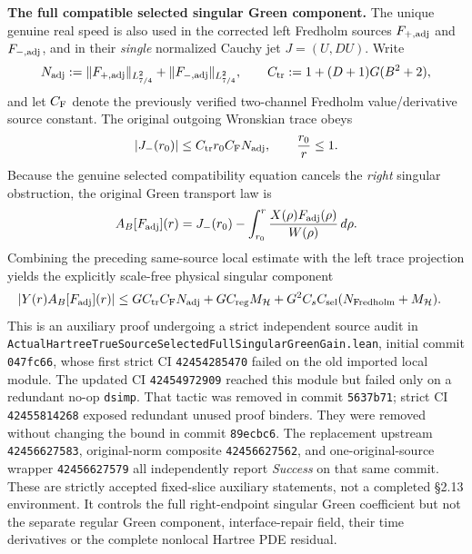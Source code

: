 \documentclass[11pt]{amsart}
\newcommand{\HH}{\mathcal H}
\begin{document}
\medskip
\noindent\textbf{The full compatible selected singular Green component.}
The unique genuine real speed is also used in the corrected left
Fredholm sources \(F_{+,{\rm adj}}\) and \(F_{-,{\rm adj}}\), and in their
\emph{single} normalized Cauchy jet \(J=(U,DU)\). Write
\[
 N_{\rm adj}
 :=\|F_{+,{\rm adj}}\|_{L^2_{7/4}}
   +\|F_{-,{\rm adj}}\|_{L^2_{7/4}},\qquad
 C_{\rm tr}:=1+(D+1)G(B^2+2),
\]
and let \(C_{\rm F}\) denote the previously verified
two-channel Fredholm value/derivative source constant.
The original outgoing Wronskian trace obeys
\[
 |J_-(r_0)|\le C_{\rm tr}r_0 C_{\rm F}N_{\rm adj},
 \qquad
 \frac{r_0}{r}\le1.
\]
Because the genuine selected compatibility equation cancels the
\emph{right} singular obstruction, the original Green transport law is
\[
 A_B[F_{\rm adj}](r)
 =J_-(r_0)-\int_{r_0}^{r}
    \frac{X(\rho)F_{\rm adj}(\rho)}{W(\rho)}\,d\rho.
\]
Combining the preceding same-source local estimate with the left trace
projection yields the explicitly scale-free physical singular component
\begin{align}
 |Y(r)A_B[F_{\rm adj}](r)|
 &\le GC_{\rm tr}C_{\rm F}N_{\rm adj}
       +GC_{\rm reg}M_{\HH}
       +G^2C_sC_{\rm sel}
           (N_{\rm Fredholm}+M_{\HH}).
 \label{eq:true-selected-full-singular-green}
\end{align}
This is an auxiliary proof undergoing a strict independent source audit in
\texttt{ActualHartreeTrueSourceSelectedFullSingularGreenGain.lean},
initial commit \texttt{047fc66}, whose first strict CI
\texttt{42454285470} failed on the old imported local module.
The updated CI \texttt{42454972909} reached this module
but failed only on a redundant no-op \texttt{dsimp}.
That tactic was removed in commit \texttt{5637b71};
strict CI \texttt{42455814268} exposed redundant unused proof binders.
They were removed without changing the bound in commit \texttt{89ecbc6}.
The replacement upstream \texttt{42456627583}, original-norm composite
\texttt{42456627562}, and one-original-source wrapper
\texttt{42456627579} all independently report \emph{Success} on
that same commit. These are strictly accepted fixed-slice auxiliary
statements, not a completed \S2.13 environment.
It controls the full right-endpoint singular Green coefficient
but not the separate regular Green component, interface-repair field,
their time derivatives or the complete nonlocal Hartree PDE residual.
\end{document}
